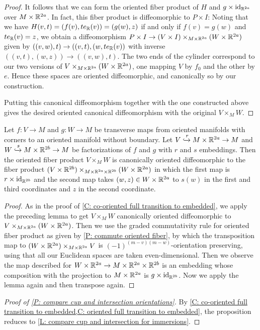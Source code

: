 \begin{proof}
	It follows that we can form the oriented fiber product of $H$ and $g\times\mathrm{id}_{\mathbb{R}^{2a}}$ over $M\times \mathbb{R}^{2a}$.
	In fact, this fiber product is diffeomorphic to $P\times I$: Noting that we have $H(v,t)=(f(v),te_{\mathbb{R}}(v))=(g(w),z)$ if and only if $f(v)=g(w)$ and $te_{\mathbb{R}}(v)=z$, we obtain a diffeomorphism $P\times I\to (V\times I)\times_{M\times \mathbb{R}^{2a}}(W\times \mathbb{R}^{2a})$ given by $((v,w),t)\to ((v,t),(w, te_{\mathbb{R}}(v))$ with inverse $((v,t),(w,z))\to ((v,w),t)$.
	The two ends of the cylinder correspond to our two versions of $V\times_{M\times \mathbb{R}^{2a}} (W\times \mathbb{R}^{2a})$, one mapping $V$ by $f_0$ and the other by $e$.
	Hence these spaces are oriented diffeomorphic, and canonically so by our construction.

	Putting this canonical diffeomorphism together with the one constructed above gives the desired oriented canonical diffeomorphism with the original $V\times_M W$.
\end{proof}

\begin{corollary}\label{C: oriented full transition to embedded}
	Let $f \colon V \to M$ and $g \colon W \to M$ be transverse maps from oriented manifolds with corners to an oriented manifold without boundary.
	Let $V\xhookrightarrow{r} M\times \mathbb{R}^{2a}\to M$ and $W\xhookrightarrow{s} M\times \mathbb{R}^{2b}\to M$ be factorizations of $f$ and $g$ with $r$ and $s$ embeddings.
	Then the oriented fiber product $V\times_M W$ is canonically oriented diffeomorphic to the fiber product $(V\times \mathbb{R}^{2b})\times_{M\times \mathbb{R}^{2a}\times \mathbb{R}^{2b}}(W\times \mathbb{R}^{2a})$ in which the first map is $r\times \mathrm{id}_{\mathbb{R}^{2b}}$ and the second map takes $(w,z)\in W\times \mathbb{R}^{2a}$ to $s(w)$ in the first and third coordinates and $z$ in the second coordinate.
\end{corollary}
\begin{proof}
	As in the proof of \cref{C: co-oriented full transition to embedded},
	we apply the preceding lemma to get $V\times_M W$ canonically oriented diffeomorphic to $V\times_{M\times \mathbb{R}^{2a}}(W\times \mathbb{R}^{2a})$.
	Then we use the graded commutativity rule for oriented fiber product as given by \cref{P: commute oriented fiber},
	by which
	the transposition map to $(W\times \mathbb{R}^{2a})\times_{M\times \mathbb{R}^{2a}}V$ is $(-1)^{(m-v)(m-w)}$-orientation preserving, using that all our Euclidean spaces are taken even-dimensional.
	Then we observe the map described for $W\times \mathbb{R}^{2a}\to M\times \mathbb{R}^{2a}\times \mathbb{R}^{2b}$ is an embedding whose composition with the projection to $M\times \mathbb{R}^{2a}$ is $g\times \mathrm{id}_{\mathbb{R}^{2b}}$.
	Now we apply the lemma again and then transpose again.
\end{proof}

\begin{proof}[Proof of \cref{P: compare cup and intersection orientations}]
	By \cref{C: co-oriented full transition to embedded,C: oriented full transition to embedded}, the proposition reduces to \cref{L: compare cup and intersection for immersions}.
\end{proof}


